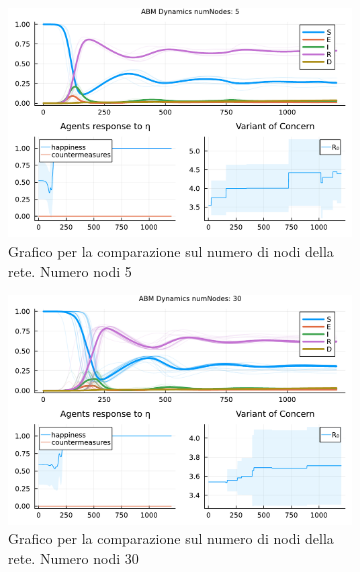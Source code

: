 \begin{figure}[!hb]
	\centering
	\begin{subfigure}[b]{0.45\textwidth}
		\centering
		\includegraphics[width=\textwidth]{img/SocialNetworkABM_1_NN.pdf}
		\caption{Grafico per la comparazione sul numero di nodi della rete. Numero nodi 5}
		\label{fig:comparison_numberOfNodes_5}
	\end{subfigure}
	\hfill
	\begin{subfigure}[b]{0.45\textwidth}
		\centering
		\includegraphics[width=\textwidth]{img/SocialNetworkABM_2_NN.pdf}
		\caption{Grafico per la comparazione sul numero di nodi della rete. Numero nodi 30}
		\label{fig:comparison_numberOfNodes_30}
	\end{subfigure}
	\hfill
	\begin{subfigure}[b]{0.45\textwidth}
		\centering

\end{subfigure}
\end{figure}
